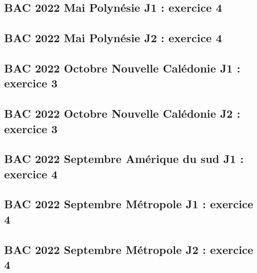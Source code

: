 \documentclass[lang=fr,edition=teacher,layout=sheet]{mxbook}
\begin{document}
\begingroup\endgroup
\par\bigskip
{}\subsection*{BAC 2022 Mai Polynésie J1 : exercice 4}
\begingroup\endgroup
\par\bigskip
{}\subsection*{BAC 2022 Mai Polynésie J2 : exercice 4}
\begingroup\endgroup
\par\bigskip
{}\subsection*{BAC 2022 Octobre Nouvelle Calédonie J1 : exercice 3}
\begingroup\endgroup
\par\bigskip
{}\subsection*{BAC 2022 Octobre Nouvelle Calédonie J2 : exercice 3}
\begingroup\endgroup
\par\bigskip
{}\subsection*{BAC 2022 Septembre Amérique du sud J1 : exercice 4}
\begingroup\endgroup
\par\bigskip
{}\subsection*{BAC 2022 Septembre Métropole J1 : exercice 4}
\begingroup\endgroup
\par\bigskip
{}\subsection*{BAC 2022 Septembre Métropole J2 : exercice 4}
\end{document}
